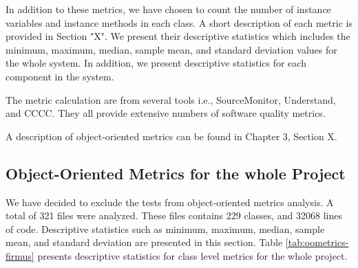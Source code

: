 In addition to these metrics, we have chosen to count the number of instance variables and instance methods in each class. A short description of each metric is provided in Section "X". We present their descriptive statistics which includes the minimum, maximum, median, sample mean, and standard deviation values for the whole system. In addition, we present descriptive statistics for each component in the system.

The metric calculation are from several tools i.e., SourceMonitor, Understand, and CCCC. They all provide extensive numbers of software quality metrics.


A description of object-oriented metrics can be found in Chapter 3, Section X. 


\subsection{Object-Oriented Metrics for the whole Project}
 We have decided to exclude the tests from object-oriented metrics analysis. A total of 321 files were analyzed. These files contains 229 classes, and 32068 lines of code. Descriptive statistics such as minimum, maximum, median, sample mean, and standard deviation are presented in this section. Table \ref{tab:oometrics-firmus} presents descriptive statistics for class level metrics for the whole project.

